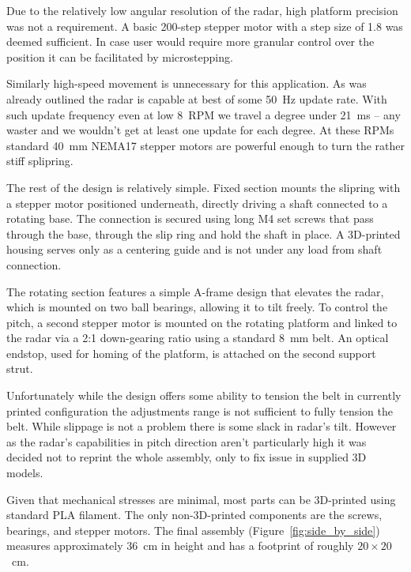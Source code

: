 Due to the relatively low angular resolution of the radar, high platform precision was not a requirement.
A basic 200-step stepper motor with a step size of 1.8 was deemed sufficient.
In case user would require more granular control over the position it can be facilitated by microstepping.

Similarly high-speed movement is unnecessary for this application.
As was already outlined the radar is capable at best of some 50~Hz update rate.
With such update frequency even at low 8~RPM we travel a degree under 21~ms -- any waster and we wouldn't get at least one update for each degree.
At these RPMs standard 40~mm NEMA17 stepper motors are powerful enough to turn the rather stiff splipring.

The rest of the design is relatively simple.
Fixed section mounts the slipring with a stepper motor positioned underneath, directly driving a shaft connected to a rotating base.
The connection is secured using long M4 set screws that pass through the base, through the slip ring and hold the shaft in place.
A 3D-printed housing serves only as a centering guide and is not under any load from shaft connection.

The rotating section features a simple A-frame design that elevates the radar, which is mounted on two ball bearings, allowing it to tilt freely.
To control the pitch, a second stepper motor is mounted on the rotating platform and linked to the radar via a 2:1 down-gearing ratio using a standard 8~mm belt.
An optical endstop, used for homing of the platform, is attached on the second support strut.

Unfortunately while the design offers some ability to tension the belt in currently printed configuration the adjustments range is not sufficient to fully tension the belt.
While slippage is not a problem there is some slack in radar's tilt.
However as the radar's capabilities in pitch direction aren't particularly high it was decided not to reprint the whole assembly, only to fix issue in supplied 3D models.

Given that mechanical stresses are minimal, most parts can be 3D-printed using standard PLA filament.
The only non-3D-printed components are the screws, bearings, and stepper motors.
The final assembly (Figure~\ref{fig:side_by_side}) measures approximately 36~cm in height and has a footprint of roughly $20\times20$~cm.

